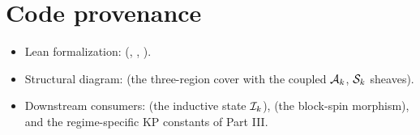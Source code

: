 \section{Code provenance}
\label{sec:sheaf-codeanchor}

\begin{itemize}
  \item Lean formalization: 
    (, ,
    ).
  \item Structural diagram: 
    (the three-region cover with the coupled $\mathcal{A}_k$,
    $\mathcal{S}_k$ sheaves).
  \item Downstream consumers:  (the
    inductive state $\mathcal{I}_k$),  (the
    block-spin morphism), and the regime-specific KP constants of
    Part III.
\end{itemize}
